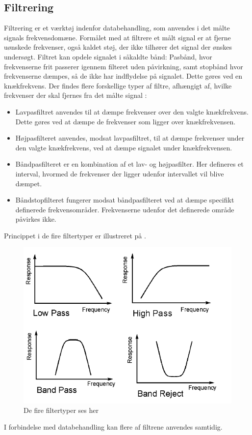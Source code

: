 \subsection{Filtrering}
Filtrering er et værktøj indenfor databehandling, som anvendes i det målte signals frekvensdomæne. Formålet med at filtrere et målt signal er at fjerne uønskede frekvenser, også kaldet støj, der ikke tilhører det signal der ønskes undersøgt. Filtret kan opdele signalet i såkaldte bånd: Pasbånd, hvor frekvenserne frit passerer igennem filteret uden påvirkning, samt stopbånd hvor frekvenserne dæmpes, så de ikke har indflydelse på signalet. Dette gøres ved en knækfrekvens.
Der findes flere forskellige typer af filtre, afhængigt af, hvilke frekvenser der skal fjernes fra det målte signal \cite{Devasahayam2000}:

\begin{itemize}
	\item Lavpasfiltret anvendes til at dæmpe frekvenser over den valgte knækfrekvens. Dette gøres ved at dæmpe de frekvenser som ligger over knækfrekvensen.
	\item Højpasfilteret anvendes, modsat lavpasfiltret, til at dæmpe frekvenser under den valgte knækfrekvens, ved at dæmpe signalet under knækfrekvensen.
	\item Båndpasfilteret er en kombination af et lav- og højpasfilter.  Her defineres et interval, hvormed de frekvenser der ligger udenfor intervallet vil blive dæmpet.
	\item Båndstopfilteret fungerer modsat båndpasfilteret ved at dæmpe specifikt definerede frekvensområder. Frekvenserne udenfor det definerede område påvirkes ikke. 
\end{itemize}
  
Princippet i de fire filtertyper er illustreret på .
\begin{figure}[H]
\centering
\includegraphics[scale=1.0]{figures/bproblemanalyse/filtertyper.png}
\caption{De fire filtertyper ses her \cite{2. semester kristian}}
\label{fig:filtertyper}
\end{figure}
I forbindelse med databehandling kan flere af filtrene anvendes samtidig. \cite{Devasahayam2000}

